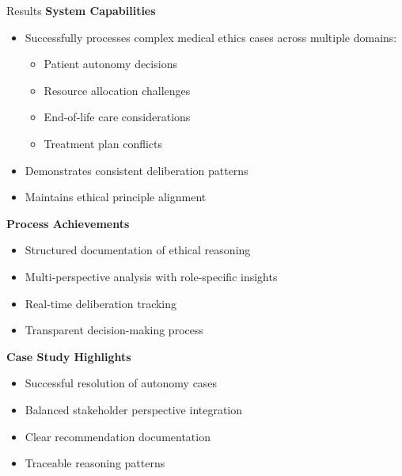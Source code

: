 \documentclass[final]{beamer}
\begin{document}
\begin{frame}[t]
\begin{columns}[t]
\begin{column}{0.32\textwidth}
        \begin{block}{Results}
            \textbf{System Capabilities}
            \begin{itemize}
                \item Successfully processes complex medical ethics cases across multiple domains:
                \begin{itemize}
                    \item Patient autonomy decisions
                    \item Resource allocation challenges
                    \item End-of-life care considerations
                    \item Treatment plan conflicts
                \end{itemize}
                \item Demonstrates consistent deliberation patterns
                \item Maintains ethical principle alignment
            \end{itemize}
            
            \textbf{Process Achievements}
            \begin{itemize}
                \item Structured documentation of ethical reasoning
                \item Multi-perspective analysis with role-specific insights
                \item Real-time deliberation tracking
                \item Transparent decision-making process
            \end{itemize}
            
            \textbf{Case Study Highlights}
            \begin{itemize}
                \item Successful resolution of autonomy cases
                \item Balanced stakeholder perspective integration
                \item Clear recommendation documentation
                \item Traceable reasoning patterns
            \end{itemize}
        \end{block}
    \end{column}
    

\end{columns}
\end{frame}
\end{document}
